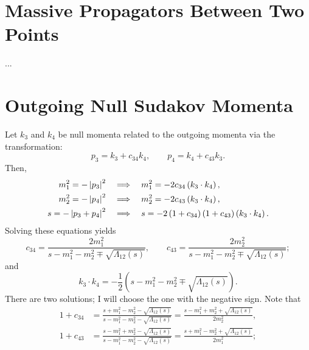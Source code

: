 \section{Massive Propagators Between Two Points}
...
\section{Outgoing Null Sudakov Momenta}
Let $k_{3}$ and $k_{4}$ be null momenta related to the outgoing momenta via the transformation:
\begin{equation}
	p_{3} = k_{3} + c_{34} k_{4}, \qquad p_{4} = k_{4} + c_{43} k_{3}.
\end{equation}
Then,
\begin{align}
	m_{1}^{2} = - \left\lvert p_{3} \right\rvert^{2} \quad &\Longrightarrow \quad m_{1}^{2} = - 2 c_{34} \left( k_{3} \cdot k_{4} \right), \\
	m_{2}^{2} = - \left\lvert p_{4} \right\rvert^{2} \quad &\Longrightarrow \quad m_{2}^{2} = - 2 c_{43} \left( k_{3} \cdot k_{4} \right), \\
	s = - \left\lvert p_{3} + p_{4} \right\rvert^{2} \quad &\Longrightarrow \quad s = - 2 \left(1 + c_{34} \right) \left(1 + c_{43} \right) \left( k_{3} \cdot k_{4} \right).
\end{align}
Solving these equations yields
\begin{equation}
	c_{34} = \frac{2 m_{1}^{2}}{s - m_{1}^{2} - m_{2}^{2} \mp \sqrt{\Lambda_{12}(s)}}, \qquad c_{43} = \frac{2 m_{2}^{2}}{s - m_{1}^{2} - m_{2}^{2} \mp \sqrt{\Lambda_{12}(s)}};
\end{equation}
and
\begin{equation}
	k_{3} \cdot k_{4} = -\frac{1}{2} \left( s - m_{1}^{2} - m_{2}^{2} \mp \sqrt{\Lambda_{12}(s)} \right).
\end{equation}
There are two solutions; I will choose the one with the negative sign.
Note that
\begin{align}
	1 + c_{34} &= \frac{s + m_{1}^{2} - m_{2}^{2} - \sqrt{\Lambda_{12}(s)}}{s - m_{1}^{2} - m_{2}^{2} - \sqrt{\Lambda_{12}(s)}} = \frac{s - m_{1}^{2} + m_{2}^{2} + \sqrt{\Lambda_{12}(s)}}{2m_{2}^{2}}, \\
	1 + c_{43} &= \frac{s - m_{1}^{2} + m_{2}^{2} - \sqrt{\Lambda_{12}(s)}}{s - m_{1}^{2} - m_{2}^{2} - \sqrt{\Lambda_{12}(s)}} = \frac{s + m_{1}^{2} - m_{2}^{2} + \sqrt{\Lambda_{12}(s)}}{2m_{1}^{2}};
\end{align}

